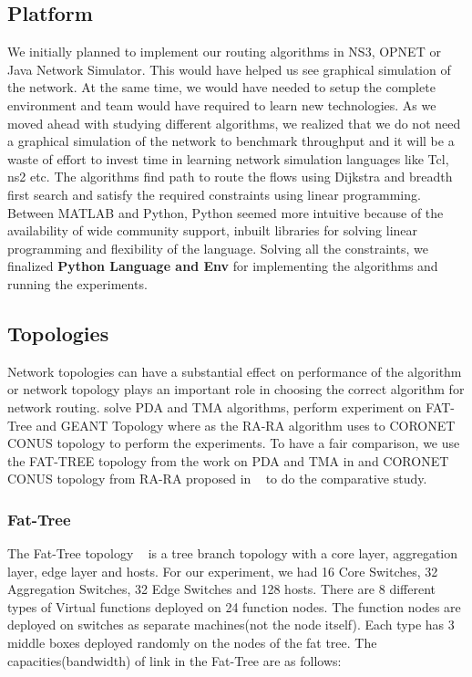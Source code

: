 \subsection{Platform}
We initially planned to implement our routing algorithms in NS3, OPNET or Java Network Simulator. This would have helped us see graphical simulation of the network. At the same time, we would have needed to setup the complete environment and team would have required to learn new technologies.  As we moved ahead with studying different algorithms, we realized that we do not need a graphical simulation of the network to benchmark throughput and it will be a waste of effort to invest time in learning network simulation languages like Tcl, ns2 etc.  The algorithms find path to route the flows using Dijkstra and breadth first search and satisfy the required constraints using linear programming. Between MATLAB and Python, Python seemed more intuitive because of the availability of wide community support, inbuilt libraries for solving linear programming and flexibility of the language. Solving all the constraints, we finalized \textbf{Python Language and Env} for implementing the algorithms and running the experiments. 

\subsection{Topologies}
Network topologies can have a substantial effect on 
performance of the algorithm or network topology plays an important role in choosing the correct algorithm for network routing. \cite{ref:paper1} solve PDA and TMA algorithms, perform experiment on FAT-Tree and GEANT Topology where as the RA-RA algorithm \cite{ref:paper2} uses to CORONET CONUS topology to perform the experiments. To have a fair comparison, we use the FAT-TREE topology from the work on PDA and TMA in \cite{ref:paper1}  and CORONET CONUS topology from RA-RA proposed in ~\cite{ref:paper2} to do the comparative study. 

\subsubsection{Fat-Tree}
The Fat-Tree topology  ~\cite{ref:fat-tree} is a tree branch topology with a core layer, aggregation layer, edge layer and hosts. For our experiment, we had 16 Core Switches, 32 Aggregation Switches, 32 Edge Switches and 128 hosts. There are 8 different types of Virtual functions deployed on 24 function nodes. The function nodes are deployed on switches as separate machines(not the node itself). Each type has 3 middle boxes deployed randomly on the nodes of the fat tree.  
The capacities(bandwidth) of link in the Fat-Tree are as follows: 

